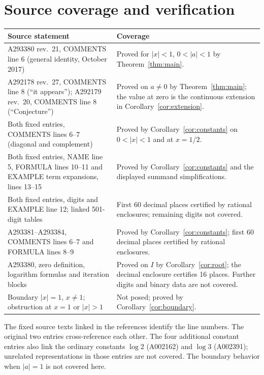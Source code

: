 \documentclass[11pt]{article}
\begin{document}
\section{Source coverage and verification}
\begin{center}\small
\begin{tabular}{@{}p{.45\linewidth}p{.48\linewidth}@{}}
\toprule
Source statement & Coverage\\\midrule
A293380 rev.\ 21, COMMENTS line 6 (general identity, October 2017)
 & Proved for $|x|<1$, $0<|a|<1$ by Theorem~\ref{thm:main}.\\[3pt]
A292178 rev.\ 27, COMMENTS line 8 (``it appears''); A292179 rev.\ 20,
COMMENTS line 8 (``Conjecture'')
 & Proved on $a\ne0$ by Theorem~\ref{thm:main}; the value at zero is
the continuous extension in Corollary~\ref{cor:extension}.\\[3pt]
Both fixed entries, COMMENTS lines 6--7 (diagonal and complement)
 & Proved by Corollary~\ref{cor:constants} on $0<|x|<1$ and at $x=1/2$.\\[3pt]
Both fixed entries, NAME line 5, FORMULA lines 10--11 and EXAMPLE
term expansions, lines 13--15
 & Proved by Corollary~\ref{cor:constants} and the displayed summand
simplifications.\\[3pt]
Both fixed entries, digits and EXAMPLE line 12; linked 501-digit tables
 & First 60 decimal places certified by rational enclosures;
remaining digits not covered.\\[3pt]
A293381--A293384, COMMENTS lines 6--7 and FORMULA lines 8--9
 & Proved by Corollary~\ref{cor:constants}; first 60 decimal places
certified by rational enclosures.\\[3pt]
A293380, zero definition, logarithm formulas and iteration blocks
 & Proved on $I$ by Corollary~\ref{cor:root}; the decimal enclosure
certifies 16 places. Further digits and binary data are not covered.\\[3pt]
Boundary $|x|=1$, $x\ne1$; obstruction at $x=1$ or $|x|>1$
 & Not posed; proved by Corollary~\ref{cor:boundary}.\\\bottomrule
\end{tabular}
\end{center}
The fixed source texts linked in the references identify the line numbers.
The original two entries cross-reference each other. The four additional
constant entries also link the ordinary constants $\log2$ (A002162)
and $\log3$ (A002391); unrelated representations in those entries are
not covered. The boundary behavior when $|a|=1$ is not covered here.
\end{document}
